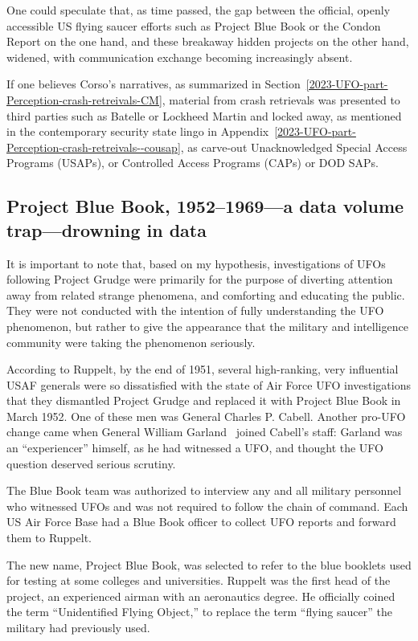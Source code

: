 One could speculate that, as time passed, the gap between the official, openly accessible US flying saucer efforts such as Project Blue Book or the Condon Report on the one hand, and these breakaway hidden projects on the other hand, widened, with communication exchange becoming increasingly absent.

If one believes Corso's narratives, as summarized in Section~\ref{2023-UFO-part-Perception-crash-retreivals-CM},
material from crash retrievals was presented to third parties such as Batelle or Lockheed Martin and locked away,
as mentioned in the contemporary security state lingo in Appendix~\ref{2023-UFO-part-Perception-crash-retreivals--cousap},
as carve-out Unacknowledged Special Access Programs (USAPs),
or Controlled Access Programs (CAPs) or DOD SAPs.



\subsection{Project Blue Book, 1952--1969---a data volume trap---drowning in data}
\label{2023-UFO-part-Perception-types-USA-PBB}

It is important to note that, based on my hypothesis, investigations of UFOs following Project Grudge
were primarily for the purpose of diverting attention away from related strange phenomena, and comforting and educating the public.
They were not conducted with the intention of fully understanding the UFO phenomenon, but rather to give the appearance that the military and intelligence community were taking the phenomenon seriously.

According to Ruppelt, by the end of 1951, several high-ranking, very influential USAF generals were so dissatisfied
with the state of Air Force UFO investigations that they dismantled Project Grudge and replaced it with Project Blue Book in March 1952.
One of these men was General Charles P. Cabell.
Another pro-UFO change came when General William Garland~\cite{GarlandUSAF,GarlandProject1947} joined Cabell's staff:
Garland was an ``experiencer'' himself, as he had witnessed a UFO, and thought the UFO question deserved serious scrutiny.

The Blue Book team was authorized to interview any and all military personnel who witnessed UFOs and was not required to follow the chain of command. Each US Air Force Base had a Blue Book officer to collect UFO reports and forward them to Ruppelt.

The new name, Project Blue Book, was selected to refer to the blue booklets used for testing at some colleges and universities.
Ruppelt was the first head of the project, an experienced airman with
an aeronautics degree. He officially coined the term ``Unidentified Flying Object,'' to replace the term ``flying saucer'' the military had previously used.


